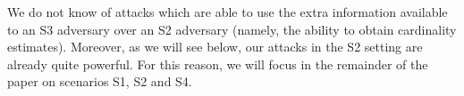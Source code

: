 \documentclass[sigconf, anonymous, dvipsnames]{acmart} %
\begin{document}
We do not know of attacks which are able to use the extra information available to an S3 adversary over an S2 adversary (namely, the ability to obtain cardinality estimates). Moreover, as we will see below, our attacks in the S2 setting are already quite powerful. For this reason, we will focus in the remainder of the paper on scenarios S1, S2 and S4.


\end{document}
